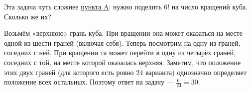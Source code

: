 \begin{itemize}
\itA {}

\itB {}

\itC Эта задача чуть сложнее \hyperref[mgap-ba]{пункта A}: нужно поделить $6!$ на число вращений куба. Сколько же их?

\ms Возьмём «верхнюю» грань куба. При вращении она может оказаться на месте одной из шести граней (включая себя). Теперь посмотрим на одну из граней, соседних с ней. При вращении та может перейти в одну из четырёх граней, соседних с той, на месте которой оказалась верхняя. Заметим, что положение этих двух граней (для которого есть ровно 24 варианта) однозначно определяет положение всех остальных. Поэтому ответ на задачу — $\tfrac{6!}{24} = 30$.
\end{itemize}